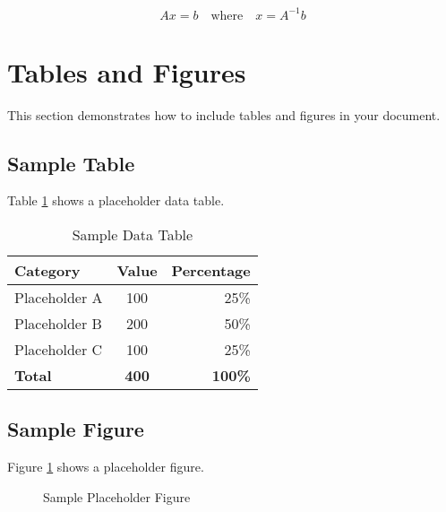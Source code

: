 \begin{equation}
Ax = b \quad \text{where} \quad x = A^{-1}b
\end{equation}

\section{Tables and Figures}\label{sec:tables-figures}

This section demonstrates how to include tables and figures in your document.

\subsection{Sample Table}\label{subsec:sample-table}

Table \ref{tab:sample-table} shows a placeholder data table.

\begin{table}[H]
\centering
\caption{Sample Data Table}
\label{tab:sample-table}
\begin{tabular}{|l|c|r|}
\hline
\textbf{Category} & \textbf{Value} & \textbf{Percentage} \\
\hline
Placeholder A & 100 & 25\% \\
Placeholder B & 200 & 50\% \\
Placeholder C & 100 & 25\% \\
\hline
\textbf{Total} & \textbf{400} & \textbf{100\%} \\
\hline
\end{tabular}
\end{table}

\subsection{Sample Figure}\label{subsec:sample-figure}

Figure \ref{fig:sample-figure} shows a placeholder figure.

\begin{figure}[H]
\centering
{}
\caption{Sample Placeholder Figure}
\label{fig:sample-figure}
\end{figure}

